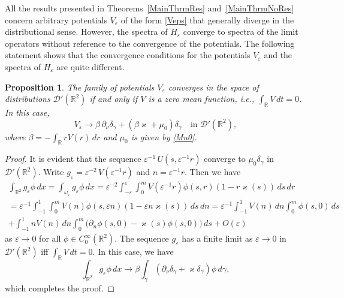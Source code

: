 \documentclass[reqno]{amsart}
\theoremstyle{plain}
\newtheorem{prop}{Proposition}
\numberwithin{equation}{section}
\renewcommand{\kappa}{\varkappa}
\newcommand{\Real}{\mathbb R}
\newcommand{\eps}{\varepsilon}
\begin{document}
All the results presented in Theorems~\ref{MainThrmRes} and~\ref{MainThrmNoRes}  concern arbitrary potentials $V_\eps$ of the form \eqref{Veps} that generally diverge in the distributional sense. However,  the spectra of $H_\eps$ converge to spectra of the limit operators  without reference to the convergence of the potentials. The following statement shows that the convergence conditions for the potentials $V_\eps$ and the spectra of $H_\eps$ are quite different.

\begin{prop}\label{PropVepsConverg}
The family of potentials $V_\eps$ converges in the space of distributions $\mathcal{D}'(\Real^2)$ if and only if $V$ is a zero mean function, i.e.,
$\int_\Real V\,dt=0$. In this case,
\begin{equation*}
  V_\eps\to \beta\,\partial_\nu\delta_\gamma+\left(\beta\kappa+\mu_0\right) \delta_\gamma \quad \text{in }\mathcal{D}'(\Real^2),
\end{equation*}
where $\beta=-\int_\Real r V(r)\,dr$ and $\mu_0$ is given by \eqref{Mu0}.
\end{prop}
\begin{proof}
It is evident that the sequence $\eps^{-1}\,U\left(s,\eps^{-1}r\right)$
converge to  $\mu_0 \delta_\gamma$ in $\mathcal{D}'(\Real^2)$.
Write $g_\eps=\eps^{-2}\,V\left(\eps^{-1}r\right)$  and $n=\eps^{-1}r$. Then we have
\begin{multline*}
\int_{\Real^2}g_\eps\phi\,dx
=\int_{\omega_\eps}g_\eps\phi\,dx
=
\eps^{-2}\int_{-\eps}^\eps\int_{0}^m V(\eps^{-1}r)\phi(s,r)(1-r\kappa(s))\,ds\,dr
\\
 =
\eps^{-1}\int_{-1}^1\int_0^m V(n)\phi(s,\eps n)(1-\eps n\kappa(s))\,ds\,dn
=\eps^{-1}\int_{-1}^1 V(n)\,dn \int_0^m\phi(s,0)\,ds
\\
+
\int_{-1}^1 n V(n)\,dn \int_0^m\big(\partial_n\phi(s,0)-\kappa(s)\phi(s,0)\big)\,ds+O(\eps)
\end{multline*}
as $\eps\to 0$  for all $\phi\in C^\infty_0(\Real^2)$.
The  sequence $g_\eps$ has a finite limit as $\eps\to 0$ in $\mathcal{D}'(\Real^2)$ iff $\int_\Real V\,dt=0$.
In this case, we have
\begin{equation*}
\int_{\Real^2}g_\eps\phi\,dx\to \beta\int_\gamma\left(\partial_\nu\delta_\gamma+\kappa \delta_\gamma\right)\phi\,d\gamma,
\end{equation*}
which completes the proof.
\end{proof}
\end{document}
